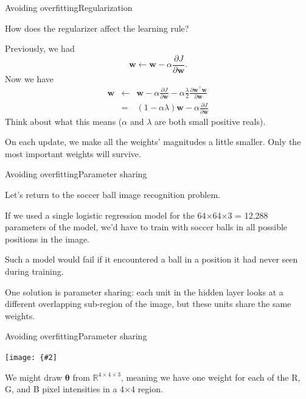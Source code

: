 \documentclass{beamer}
\renewcommand{\vec}[1]{\boldsymbol{#1}}
\def\Rset{\mathbb{R}}
\newcommand{\myfig}[3]{\centerline{\texttt{[image: \{\#2]}}}
\begin{document}
\begin{frame}{Avoiding overfitting}{Regularization}

  How does the regularizer affect the learning rule?

  \medskip

  Previously, we had
  \[ \vec{w} \leftarrow \vec{w} - \alpha \frac{\partial J}{\partial \vec{w}}. \]
  Now we have
  \begin{eqnarray*}
    \vec{w} & \leftarrow & \vec{w} - \alpha \frac{\partial J}{\partial \vec{w}} - \alpha \frac{\lambda}{2} \frac{\partial \vec{w}^\top\vec{w}}{\partial \vec{w}} \\
    & = & (1 - \alpha \lambda)\vec{w} - \alpha \frac{\partial J}{\partial \vec{w}}
  \end{eqnarray*}
  Think about what this means ($\alpha$ and $\lambda$ are both small
  positive reals).

  \medskip

  On each update, we make all the weights' magnitudes a little
  smaller. Only the most important weights will survive.
  
\end{frame}


\begin{frame}{Avoiding overfitting}{Parameter sharing}

  Let's return to the soccer ball image recognition problem.

  \medskip

  If we used a single logistic regression model for the
  64$\times$64$\times$3 = 12,288 parameters of the model, we'd have to
  train with soccer balls in \alert{all possible positions in the image}.

  \medskip

  Such a model would fail if it encountered a ball in a position it
  had never seen during training.
  
  \medskip

  One solution is \alert{parameter sharing}: each unit in the hidden
  layer looks at a different overlapping sub-region of the image, but
  these units \alert{share the same weights}.

\end{frame}


\begin{frame}{Avoiding overfitting}{Parameter sharing}

  \myfig{2.5in}{soccer-sharing}{Ng (2017), CS229 lecture notes}

  \medskip

  We might draw $\vec{\theta}$ from $\Rset^{4\times 4\times 3}$,
  meaning we have one weight for each of the R, G, and B pixel
  intensities in a 4$\times$4 region.

\end{frame}
\end{document}

